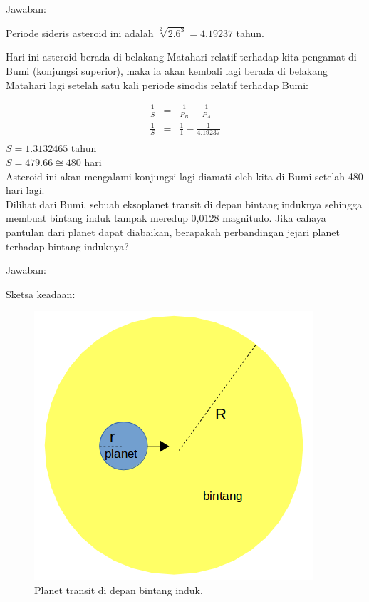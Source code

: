 \documentclass[11pt,fleqn]{exam}
\begin{document}
\begin{questions}
Jawaban:

Periode sideris asteroid ini adalah $\sqrt[2]{2.6^{3}} = 4.19237$ tahun.

Hari ini asteroid berada di belakang Matahari relatif terhadap kita pengamat di Bumi (konjungsi superior), maka ia akan kembali lagi berada di belakang Matahari lagi setelah satu kali periode sinodis relatif terhadap Bumi:

\begin{eqnarray*}
\frac{1}{S} &=& \frac{1}{P_{B}} - \frac{1}{P_{A}}\\
\frac{1}{S} &=& \frac{1}{1} - \frac{1}{4.19237}\\
\end{eqnarray*}
$S = 1.3132465$ tahun\\
$S = 479.66 \cong 480$ hari \\
Asteroid ini akan mengalami konjungsi lagi diamati oleh kita di Bumi setelah 480 hari lagi.\\


\question Dilihat dari Bumi, sebuah eksoplanet transit di depan bintang induknya sehingga membuat bintang induk tampak meredup 0,0128 magnitudo. Jika cahaya pantulan dari planet dapat diabaikan, berapakah perbandingan jejari planet terhadap bintang induknya?

Jawaban:

Sketsa keadaan:

\begin{figure}[H]
\centering
\includegraphics[scale=0.4]{transit-planet.png}
\caption{Planet transit di depan bintang induk.}
\end{figure}


\end{questions}
\end{document}
